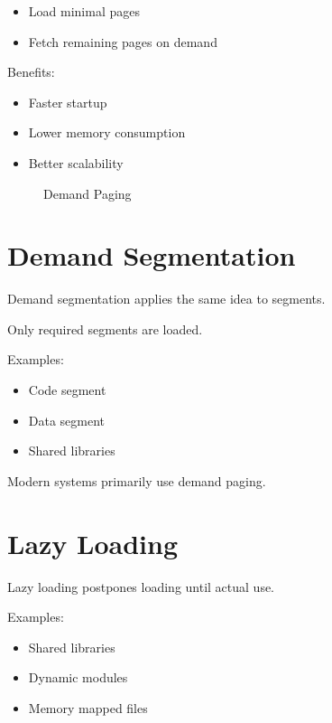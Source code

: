 \begin{itemize}
\item Load minimal pages
\item Fetch remaining pages on demand
\end{itemize}

Benefits:

\begin{itemize}
\item Faster startup
\item Lower memory consumption
\item Better scalability
\end{itemize}

\begin{figure}[H]
\centering
{}
\caption{Demand Paging}
\end{figure}

\section{Demand Segmentation}

Demand segmentation applies the same idea to segments.

Only required segments are loaded.

Examples:

\begin{itemize}
\item Code segment
\item Data segment
\item Shared libraries
\end{itemize}

Modern systems primarily use demand paging.

\section{Lazy Loading}

Lazy loading postpones loading until actual use.

Examples:

\begin{itemize}
\item Shared libraries
\item Dynamic modules
\item Memory mapped files
\end{itemize}

